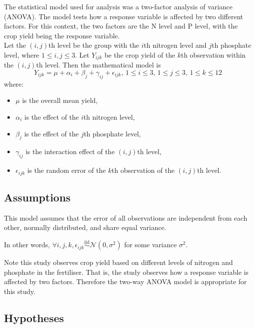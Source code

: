 \documentclass[12pt]{article}
\begin{document}
The statistical model used for analysis was a two-factor analysis of variance (ANOVA).
The model tests how a response variable is affected by two different factors.
For this context, the two factors are the N level and P level, with the crop yield being the response variable. \\
Let the \((i,j)\)th level be the group with the \(i\)th nitrogen level and \(j\)th phosphate level, where \(1 \leq i,j \leq 3\).
Let \(Y_{ijk}\) be the crop yield of the \(k\)th observation within the \((i,j)\)th level.
Then the mathematical model is
\[
    Y_{ijk} = \mu + \alpha_i + \beta_j + \gamma_{ij} + \epsilon_{ijk},\, 1 \leq i \leq 3,\, 1 \leq j \leq 3,\, 1 \leq k \leq 12
\]
where:
\begin{itemize}
    \item \(\mu\) is the overall mean yield,
    \item \(\alpha_i\) is the effect of the \(i\)th nitrogen level,
    \item \(\beta_j\) is the effect of the \(j\)th phosphate level,
    \item \(\gamma_{ij}\) is the interaction effect of the \((i,j)\)th level,
    \item \(\epsilon_{ijk}\) is the random error of the \(k\)th observation of the \((i,j)\)th level.
\end{itemize}

\vspace{2em}

\subsection{Assumptions}

This model assumes that the error of all observations are independent from each other, normally distributed, and share equal variance.

In other words, $\forall i, j, k, \epsilon_{ijk} \overset{\text{iid}}{\sim} \mathcal{N}(0, \sigma^2)$ for some variance $\sigma^2$.

Note this study observes crop yield based on different levels of nitrogen and phosphate in the fertiliser.
That is, the study observes how a response variable is affected by two factors.
Therefore the two-way ANOVA model is appropriate for this study.

\subsection{Hypotheses}
\end{document}
